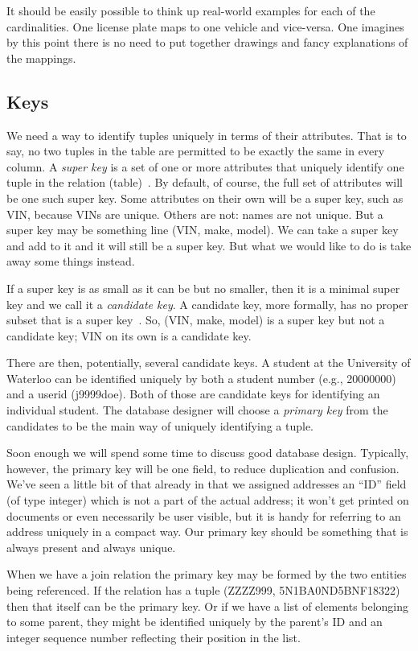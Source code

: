 It should be easily possible to think up real-world examples for each of the cardinalities. One license plate maps to one vehicle and vice-versa. One imagines by this point there is no need to put together drawings and fancy explanations of the mappings.

\subsection*{Keys}

We need a way to identify tuples uniquely in terms of their attributes. That is to say, no two tuples in the table are permitted to be exactly the same in every column. A \textit{super key} is a set of one or more attributes that uniquely identify one tuple in the relation (table)~\cite{dsc}. By default, of course, the full set of attributes will be one such super key. Some attributes on their own will be a super key, such as VIN, because VINs are unique. Others are not: names are not unique. But a super key may be something line (VIN, make, model). We can take a super key and add to it and it will still be a super key. But what we would like to do is take away some things instead.

If a super key is as small as it can be but no smaller, then it is a minimal super key and we call it a \textit{candidate key}. A candidate key, more formally, has no proper subset that is a super key~\cite{dsc}. So, (VIN, make, model) is a super key but not a candidate key; VIN on its own is a candidate key.

There are then, potentially, several candidate keys. A student at the University of Waterloo can be identified uniquely by both a student number (e.g., 20000000) and a userid (j9999doe). Both of those are candidate keys for identifying an individual student. The database designer will choose a \textit{primary key} from the candidates to be the main way of uniquely identifying a tuple. 

Soon enough we will spend some time to discuss good database design. Typically, however, the primary key will be one field, to reduce duplication and confusion. We've seen a little bit of that already in that we assigned addresses an ``ID'' field (of type integer) which is not a part of the actual address; it won't get printed on documents or even necessarily be user visible, but it is handy for referring to an address uniquely in a compact way. Our primary key should be something that is always present and always unique.

When we have a join relation the primary key may be formed by the two entities being referenced. If the relation has a tuple (ZZZZ999, 5N1BA0ND5BNF18322) then that itself can be the primary key. Or if we have a list of elements belonging to some parent, they might be identified uniquely by the parent's ID and an integer sequence number reflecting their position in the list. 

